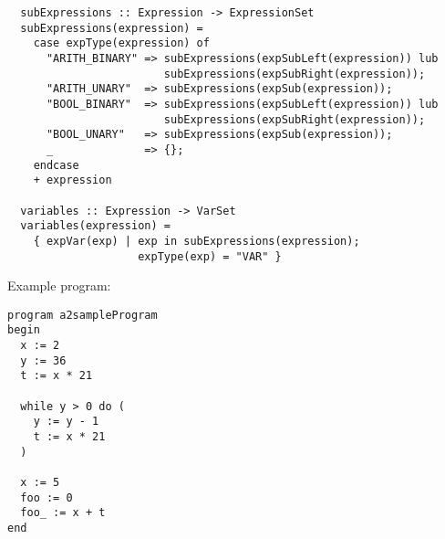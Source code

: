 \documentclass[a4paper]{article}
\begin{document}
\begin{verbatim}
  subExpressions :: Expression -> ExpressionSet
  subExpressions(expression) =
    case expType(expression) of
      "ARITH_BINARY" => subExpressions(expSubLeft(expression)) lub 
                        subExpressions(expSubRight(expression));
      "ARITH_UNARY"  => subExpressions(expSub(expression));
      "BOOL_BINARY"  => subExpressions(expSubLeft(expression)) lub 
                        subExpressions(expSubRight(expression));
      "BOOL_UNARY"   => subExpressions(expSub(expression));
      _              => {};
    endcase
    + expression
     
  variables :: Expression -> VarSet
  variables(expression) = 
    { expVar(exp) | exp in subExpressions(expression);
                    expType(exp) = "VAR" }

  \end{verbatim}

  Example program:
  \begin{verbatim}
program a2sampleProgram
begin
  x := 2
  y := 36
  t := x * 21

  while y > 0 do (
    y := y - 1
    t := x * 21
  )

  x := 5
  foo := 0
  foo_ := x + t
end
  \end{verbatim}
\end{document}
